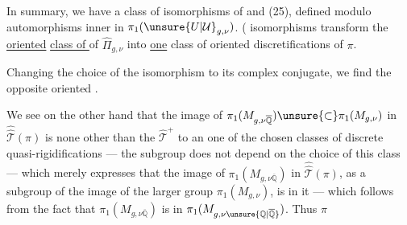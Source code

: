 In summary, we have a class of isomorphisms of  and (25), defined modulo automorphisms  inner in  $\pi_1(\unsure{U|\mathcal{U}}_{g,\nu})$. (  isomorphisms transform the   \uline{oriented} \uline{class of } of $\widehat{\Pi}_{g,\nu}$ into   \uline{one} class of oriented discretifications of $\pi$.




Changing the choice of the isomorphism to its complex conjugate, we find the opposite oriented  .

We see on the other hand that the image of $\pi_1(M_{g,\nu\overline{\mathbb Q}})\unsure{\subset}\pi_1(M_{g,\nu})$ in $\widehat{\widehat{\mathcal T}}(\pi)$ is none other than the $\widehat{\mathcal T}^{+}$  to an  one of the chosen classes of discrete quasi-rigidifications --- the subgroup does not depend on the choice of this class --- which merely expresses that the image of $\pi_1(M_{g,\nu\overline{\mathbb Q}})$ in $\widehat{\widehat{\mathcal T}}(\pi)$,  as a subgroup of the image of the larger group $\pi_1(M_{g,\nu})$, is  in it --- which follows from the fact that $\pi_1(M_{g,\nu\overline{\mathbb Q}})$ is  in $\pi_1(M_{g,\nu\unsure{\mathbb Q|\overline{\mathbb Q}}})$. Thus $\pi$

